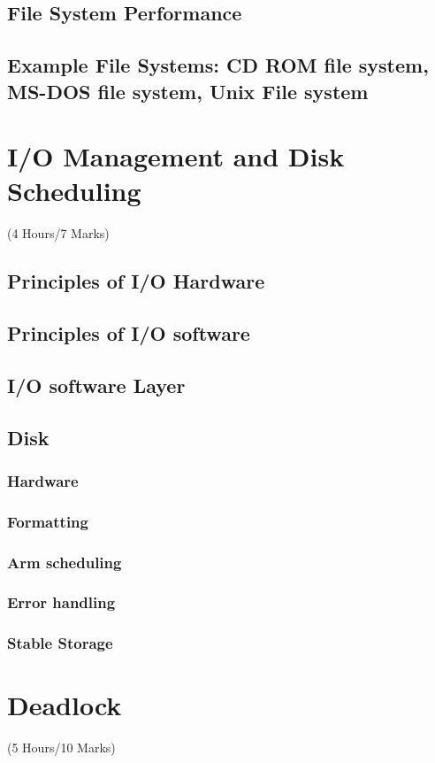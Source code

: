 \documentclass[12pt]{article}
\begin{document}
\subsection{File System Performance}
\subsection{Example File Systems: CD ROM file system, MS-DOS file system, Unix File system}

\pagebreak
\section{I/O Management and Disk Scheduling}
\begin{center}(4 Hours/7 Marks)\end{center}
\subsection{Principles of I/O Hardware}
\subsection{Principles of I/O software}
\subsection{I/O software Layer}
\subsection{Disk}
\subsubsection{Hardware}
\subsubsection{Formatting}
\subsubsection{Arm scheduling}
\subsubsection{Error handling}
\subsubsection{Stable Storage}

\pagebreak
\section{Deadlock}
\begin{center}(5 Hours/10 Marks)\end{center}
\end{document}
